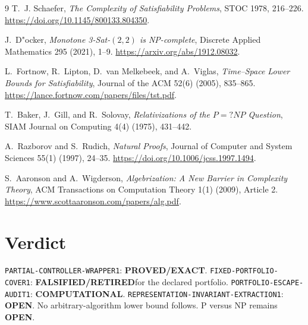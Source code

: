 \documentclass[11pt]{article}
\newcommand{\EXACT}{\textbf{PROVED/EXACT}}
\newcommand{\OPEN}{\textbf{OPEN}}
\newcommand{\RETIRED}{\textbf{FALSIFIED/RETIRED}}
\newcommand{\COMP}{\textbf{COMPUTATIONAL}}
\begin{document}
\begin{thebibliography}{9}
T.~J. Schaefer, \emph{The Complexity of Satisfiability Problems},
STOC 1978, 216--226. \url{https://doi.org/10.1145/800133.804350}.

J.~D"ocker, \emph{Monotone 3-Sat-$(2,2)$ is NP-complete},
Discrete Applied Mathematics 295 (2021), 1--9.
\url{https://arxiv.org/abs/1912.08032}.

L.~Fortnow, R.~Lipton, D.~van Melkebeek, and A.~Viglas,
\emph{Time--Space Lower Bounds for Satisfiability},
Journal of the ACM 52(6) (2005), 835--865.
\url{https://lance.fortnow.com/papers/files/tst.pdf}.

T.~Baker, J.~Gill, and R.~Solovay,
\emph{Relativizations of the $P=?NP$ Question},
SIAM Journal on Computing 4(4) (1975), 431--442.

A.~Razborov and S.~Rudich, \emph{Natural Proofs},
Journal of Computer and System Sciences 55(1) (1997), 24--35.
\url{https://doi.org/10.1006/jcss.1997.1494}.

S.~Aaronson and A.~Wigderson,
\emph{Algebrization: A New Barrier in Complexity Theory},
ACM Transactions on Computation Theory 1(1) (2009), Article 2.
\url{https://www.scottaaronson.com/papers/alg.pdf}.
\end{thebibliography}

\section*{Verdict}

\texttt{PARTIAL-CONTROLLER-WRAPPER1}: \EXACT.
\texttt{FIXED-PORTFOLIO-COVER1}: \RETIRED for the declared portfolio.
\texttt{PORTFOLIO-ESCAPE-AUDIT1}: \COMP.
\texttt{REPRESENTATION-INVARIANT-EXTRACTION1}: \OPEN.
No arbitrary-algorithm lower bound follows.  P versus NP remains \OPEN.

\end{document}
